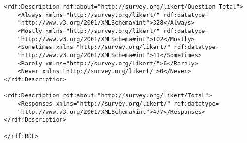 \begin{lstlisting}
<rdf:Description rdf:about="http://survey.org/likert/Question_Total">
	<Always xmlns="http://survey.org/likert/" rdf:datatype=
	"http://www.w3.org/2001/XMLSchema#int">328</Always>
	<Mostly xmlns="http://survey.org/likert/" rdf:datatype=
	"http://www.w3.org/2001/XMLSchema#int">102</Mostly>
	<Sometimes xmlns="http://survey.org/likert/" rdf:datatype=
	"http://www.w3.org/2001/XMLSchema#int">41</Sometimes>
	<Rarely xmlns="http://survey.org/likert/">6</Rarely>
	<Never xmlns="http://survey.org/likert/">0</Never>
</rdf:Description>

<rdf:Description rdf:about="http://survey.org/likert/Total">
	<Responses xmlns="http://survey.org/likert/" rdf:datatype=
	"http://www.w3.org/2001/XMLSchema#int">477</Responses>
</rdf:Description>

</rdf:RDF>
\end{lstlisting}
